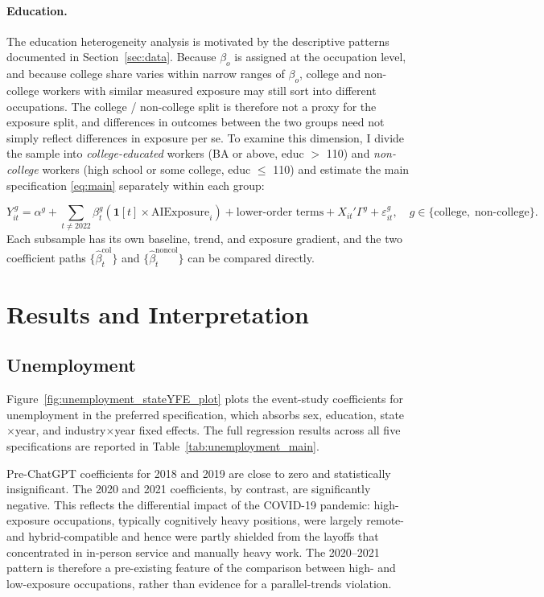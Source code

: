 \documentclass[11pt]{article}
\theoremstyle{plain}
\theoremstyle{remark}
\begin{document}
\paragraph{Education.} The education heterogeneity analysis is motivated by the descriptive patterns documented in Section~\ref{sec:data}. Because $\beta_o$ is assigned at the occupation level, and because college share varies within narrow ranges of $\beta_o$, college and non-college workers with similar measured exposure may still sort into different occupations. The college / non-college split is therefore not a proxy for the exposure split, and differences in outcomes between the two groups need not simply reflect differences in exposure per se. To examine this dimension, I divide the sample into \textit{college-educated} workers (BA or above, educ $>$ 110) and \textit{non-college} workers (high school or some college, educ $\leq$ 110) and estimate the main specification \eqref{eq:main} separately within each group:



\begin{equation}
\label{eq:split}
Y_{it}^{\,g} = \alpha^g
  + \sum_{t \neq 2022} \beta_t^g \left( \mathbf{1}[t] \times \text{AIExposure}_i \right)
  + \text{lower-order terms} + X_{it}'\Gamma^g + \varepsilon_{it}^g, \quad g \in \{\text{college},\;\text{non-college}\}.
\end{equation}
Each subsample has its own baseline, trend, and exposure gradient, and the two coefficient paths $\{\hat\beta_t^{\text{col}}\}$ and $\{\hat\beta_t^{\text{noncol}}\}$ can be compared directly.

\section{Results and Interpretation}
\label{sec:results}

\subsection{Unemployment}

Figure~\ref{fig:unemployment_stateYFE_plot} plots the event-study coefficients for unemployment in the preferred specification, which absorbs sex, education, state$\times$year, and industry$\times$year fixed effects.  The full regression results across all five specifications are reported in Table~\ref{tab:unemployment_main}.

Pre-ChatGPT coefficients for 2018 and 2019 are close to zero and statistically insignificant.  The 2020 and 2021 coefficients, by contrast, are significantly negative.  This reflects the differential impact of the COVID-19 pandemic: high-exposure occupations, typically cognitively heavy positions, were largely remote- and hybrid-compatible and hence were partly shielded from the layoffs that concentrated in in-person service and manually heavy work. The 2020--2021 pattern is therefore a pre-existing feature of the comparison between high- and low-exposure occupations, rather than evidence for a parallel-trends violation.
\end{document}
